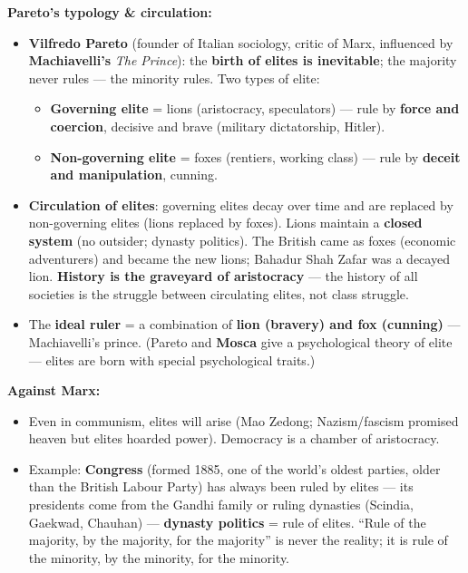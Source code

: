 \begin{DataFact}
\textbf{Pareto's typology \& circulation:}
\begin{itemize}
\item \textbf{Vilfredo Pareto} (founder of Italian sociology, critic of Marx, influenced by \textbf{Machiavelli's} \textit{The Prince}): the \textbf{birth of elites is inevitable}; the majority never rules --- the minority rules. Two types of elite:
\begin{itemize}
\item \textbf{Governing elite} = lions (aristocracy, speculators) --- rule by \textbf{force and coercion}, decisive and brave (military dictatorship, Hitler).
\item \textbf{Non-governing elite} = foxes (rentiers, working class) --- rule by \textbf{deceit and manipulation}, cunning.
\end{itemize}
\item \textbf{Circulation of elites}: governing elites decay over time and are replaced by non-governing elites (lions replaced by foxes). Lions maintain a \textbf{closed system} (no outsider; dynasty politics). The British came as foxes (economic adventurers) and became the new lions; Bahadur Shah Zafar was a decayed lion. \textbf{History is the graveyard of aristocracy} --- the history of all societies is the struggle between circulating elites, not class struggle.
\item The \textbf{ideal ruler} = a combination of \textbf{lion (bravery) and fox (cunning)} --- Machiavelli's prince. (Pareto and \textbf{Mosca} give a psychological theory of elite --- elites are born with special psychological traits.)
\end{itemize}
\end{DataFact}

\begin{CriticalPoint}
\textbf{Against Marx:}
\begin{itemize}
\item Even in communism, elites will arise (Mao Zedong; Nazism/fascism promised heaven but elites hoarded power). Democracy is a chamber of aristocracy.
\item Example: \textbf{Congress} (formed 1885, one of the world's oldest parties, older than the British Labour Party) has always been ruled by elites --- its presidents come from the Gandhi family or ruling dynasties (Scindia, Gaekwad, Chauhan) --- \textbf{dynasty politics} = rule of elites. ``Rule of the majority, by the majority, for the majority'' is never the reality; it is rule of the minority, by the minority, for the minority.
\end{itemize}
\end{CriticalPoint}

